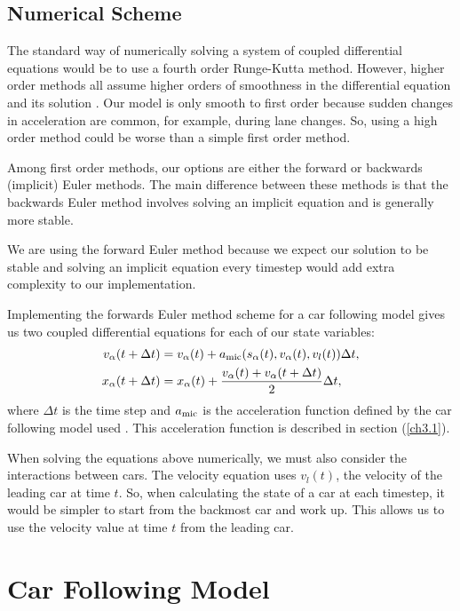 \documentclass[12pt]{article}
\begin{document}
    \subsection{Numerical Scheme}\label{num_sch}
    The standard way of numerically solving a system of coupled differential equations would be to use a fourth order Runge-Kutta method.
    However, higher order methods all assume higher orders of smoothness in the differential equation and its solution \cite{numerics}.
    Our model is only smooth to first order because sudden changes in acceleration are common, for example, during lane changes. 
    So, using a high order method could be worse than a simple first order method.

    Among first order methods, our options are either the forward or backwards (implicit) Euler methods. The main difference between these methods is that the backwards Euler method involves solving an implicit equation and is generally more stable.

    We are using the forward Euler method because we expect our solution to be stable and solving an implicit equation every timestep would add extra complexity to our implementation.

    Implementing the forwards Euler method scheme for a car following model gives us two coupled differential equations for each of our state variables:
    \begin{align}
        v_\alpha(t+\Delta t) &= v_\alpha(t) +a_{\rm mic}(s_\alpha(t), v_\alpha (t), v_l (t))\Delta t, \label{num_eq1}\\
        x_\alpha(t + \Delta t) &= x_\alpha(t) + \frac{v_\alpha (t) + v_\alpha (t+\Delta t)}{2}\Delta t \label{num_eq2},
    \end{align}
    where $\Delta t$ is the time step and $a_{\rm mic}$ is the acceleration function defined by the car following model used \cite{traffic}. This acceleration function is described in section (\ref{ch3.1}).

    When solving the equations above numerically, we must also consider the interactions between cars. The velocity equation uses $v_l(t)$, the velocity of the leading car at time $t$. So, when calculating the state of a car at each timestep, it would be simpler to start from the backmost car and work up. This allows us to use the velocity value at time $t$ from the leading car.     
    \section{Car Following Model}
\end{document}

